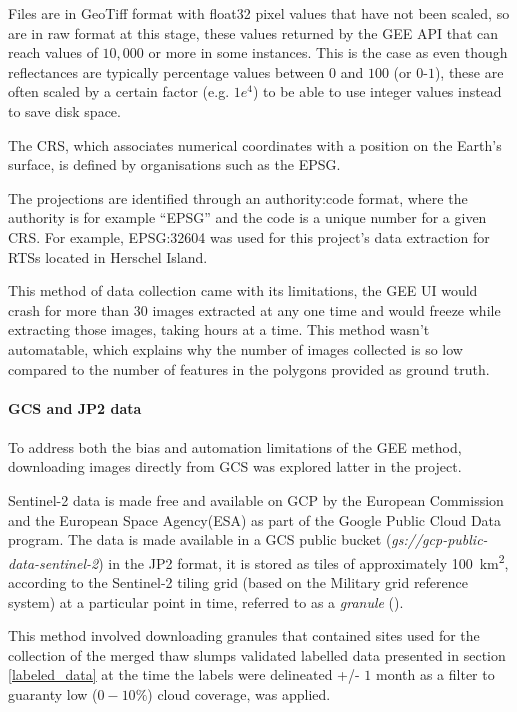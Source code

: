 Files are in GeoTiff format with float32 pixel values that have not been scaled, so are in raw format at this stage, these values returned by the \gls{GEE} API that can reach values of $10,000$ or more in some instances. This is the case as even though reflectances are typically percentage values between $0$ and $100$ (or $0$-$1$), these are often scaled by a certain factor (e.g. $1 e^4$) to be able to use integer values instead to save disk space. 

The \gls{CRS}, which associates numerical coordinates with a position on the Earth's surface, is defined by organisations such as the \gls{EPSG}.

The projections are identified through an authority:code format, where the authority is for example “\gls{EPSG}” and the code is a unique number for a given \gls{CRS}. For example, \gls{EPSG}:32604 was used for this project's data extraction for \gls{RTS}s located in Herschel Island.

This method of data collection came with its limitations, the \gls{GEE} \gls{UI} would crash for more than 30 images extracted at any one time and would freeze while extracting those images, taking hours at a time. This method wasn't automatable, which explains why the number of images collected is so low compared to the number of features in the polygons provided as ground truth.
\paragraph{\gls{GCS} and \gls{JP2} data}
\paragraph{}
To address both the bias and automation limitations of the \gls{GEE} method, downloading images directly from \gls{GCS} was explored latter in the project.

Sentinel-2 data is made free and available on \gls{GCP} by the European Commission and the European Space Agency(ESA) as part of the Google Public Cloud Data program. The data is made available in a \gls{GCS} public bucket (\textit{gs://gcp-public-data-sentinel-2}) in the \gls{JP2} format, it is stored as tiles of approximately \SI{100}{\kilo\metre\squared}, according to the Sentinel-2 tiling grid (based on the Military grid reference system) at a particular point in time, referred to as a \textit{granule} (\cite{sentinel2_gcp}).

This method involved downloading granules that contained sites used for the collection of the merged thaw slumps validated labelled data presented in section \ref{labeled_data} at the time the labels were delineated +/- $1$ month as a filter to guaranty low ($0-10\%$) cloud coverage, was applied.

